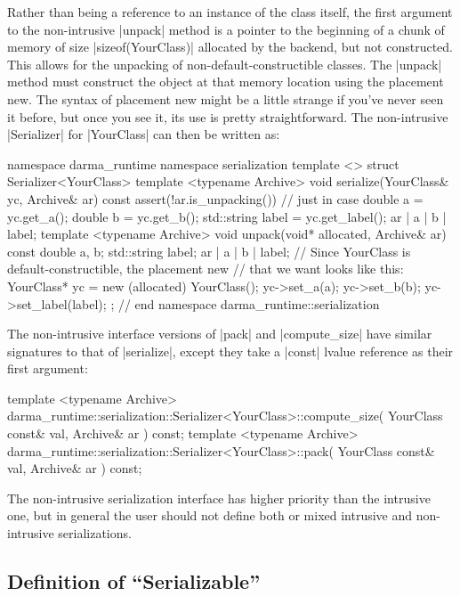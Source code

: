 Rather than being a reference to an instance of the class itself, the first
argument to the non-intrusive |unpack| method is a pointer to the beginning of a
chunk of memory of size |sizeof(YourClass)| allocated by the backend, but not
constructed.  This allows for the unpacking of non-default-constructible
classes.  The |unpack| method must construct the object at that memory
location using the \CC{} placement new.  The syntax of placement new might be a
little strange if you've never seen it before, but once you see it, its use is
pretty straightforward.  The non-intrusive |Serializer| for |YourClass| can then
be written as:
\begin{CppCodeNumb}
namespace darma_runtime { namespace serialization {
template <>
struct Serializer<YourClass> {
  template <typename Archive>
  void serialize(YourClass& yc, Archive& ar) const {
    assert(!ar.is_unpacking()) // just in case
    double a = yc.get_a();
    double b = yc.get_b();
    std::string label = yc.get_label();
    ar | a | b | label;
  }
  template <typename Archive>
  void unpack(void* allocated, Archive& ar) const {
    double a, b;
    std::string label;
    ar | a | b | label;
    // Since YourClass is default-constructible, the placement new
    // that we want looks like this:
    YourClass* yc = new (allocated) YourClass();
    yc->set_a(a);
    yc->set_b(b);
    yc->set_label(label);
  }
};
}} // end namespace darma_runtime::serialization
\end{CppCodeNumb}
The non-intrusive interface versions of |pack| and |compute_size| have similar
signatures to that of |serialize|, except they take a |const| lvalue reference
as their first argument:
\begin{CppCodeNumb}
template <typename Archive>
darma_runtime::serialization::Serializer<YourClass>::compute_size(
  YourClass const& val, Archive& ar
) const;
template <typename Archive>
darma_runtime::serialization::Serializer<YourClass>::pack(
  YourClass const& val, Archive& ar
) const;
\end{CppCodeNumb}

The non-intrusive serialization interface has higher priority than the intrusive
one, but in general the user should not define both or mixed intrusive and
non-intrusive serializations.

\subsection{Definition of ``Serializable''}

